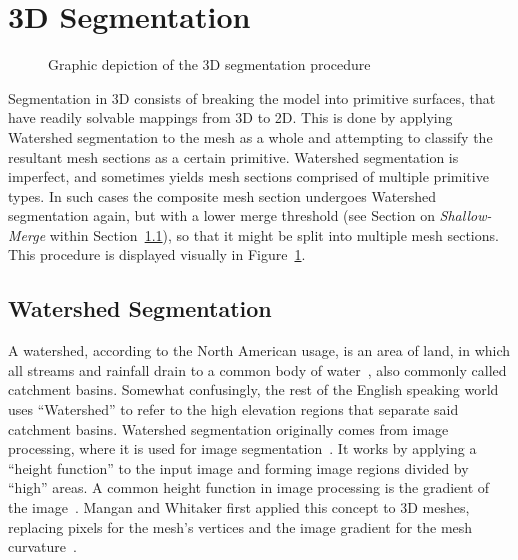 \section{3D Segmentation}
\begin{figure}[H]
	\centering
{}
	\caption{Graphic depiction of the 3D segmentation procedure}
	\label{fig:Seg3D}
\end{figure}
Segmentation in 3D consists of breaking the model into primitive surfaces, that have readily solvable mappings from 3D to 2D.
This is done by applying Watershed segmentation to the mesh as a whole and attempting to classify the resultant mesh sections as a certain primitive.
Watershed segmentation is imperfect, and sometimes yields mesh sections comprised of multiple primitive types.
In such cases the composite mesh section undergoes Watershed segmentation again, but with a lower merge threshold (see Section on \textit{Shallow-Merge} within Section~\ref{sec:ws_seg}), so that it might be split into multiple mesh sections.
This procedure is displayed visually in Figure~\ref{fig:Seg3D}.

\subsection{Watershed Segmentation}\label{sec:ws_seg}
A watershed, according to the North American usage, is an area of land, in which all streams and rainfall drain to a common body of water~\cite{USGS_Watersheds}, also commonly called catchment basins.
Somewhat confusingly, the rest of the English speaking world uses ``Watershed'' to refer to the high elevation regions that separate said catchment basins.
Watershed segmentation originally comes from image processing, where it is used for image segmentation~\cite{ImageSegWS, DigitalImageProc}.
It works by applying a ``height function'' to the input image and forming image regions divided by ``high'' areas.
A common height function in image processing is the gradient of the image~\cite{ImageSegWS}.
Mangan and Whitaker first applied this concept to 3D meshes, replacing pixels for the mesh's vertices and the image gradient for the mesh curvature~\cite{Watershed}.

